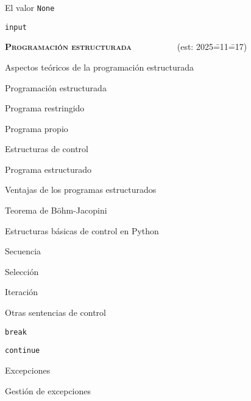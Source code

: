 \begin{longenum}
\begin{longenum}
\begin{longenum}
\begin{longenum}
\begin{longenum}
                    \item El valor \texttt{None}
                \end{longenum}
                \item \texttt{input}
            \end{longenum}
        \end{longenum}
    \end{longenum}
    \item \textbf{\textsc{Programación estructurada}} \ \ \ \ \ \ \ \ \ \ (est: 2025\==11\==17)
    \begin{longenum}
        \item Aspectos teóricos de la programación estructurada
        \begin{longenum}
            \item Programación estructurada
            \item Programa restringido
            \item Programa propio
            \item Estructuras de control
            \item Programa estructurado
            \begin{longenum}
                \item Ventajas de los programas estructurados
            \end{longenum}
            \item Teorema de Böhm-Jacopini
        \end{longenum}
        \item Estructuras básicas de control en Python
        \begin{longenum}
            \item Secuencia
            \item Selección
            \item Iteración
            \item Otras sentencias de control
            \begin{longenum}
                \item \texttt{break}
                \item \texttt{continue}
                \item Excepciones
                \begin{longenum}
                    \item Gestión de excepciones
                \end{longenum}

\end{longenum}
\end{longenum}
\end{longenum}
\end{longenum}
